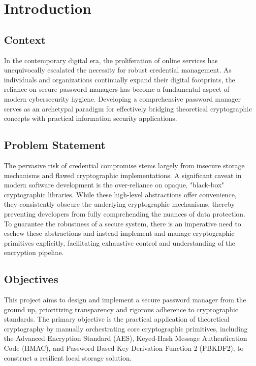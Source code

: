 \chapter{Introduction}
\label{ch:intro}

\section{Context}
In the contemporary digital era, the proliferation of online services has unequivocally escalated the necessity for robust credential management. As individuals and organizations continually expand their digital footprints, the reliance on secure password managers has become a fundamental aspect of modern cybersecurity hygiene. Developing a comprehensive password manager serves as an archetypal paradigm for effectively bridging theoretical cryptographic concepts with practical information security applications.

\section{Problem Statement}
The pervasive risk of credential compromise stems largely from insecure storage mechanisms and flawed cryptographic implementations. A significant caveat in modern software development is the over-reliance on opaque, "black-box" cryptographic libraries. While these high-level abstractions offer convenience, they consistently obscure the underlying cryptographic mechanisms, thereby preventing developers from fully comprehending the nuances of data protection. To guarantee the robustness of a secure system, there is an imperative need to eschew these abstractions and instead implement and manage cryptographic primitives explicitly, facilitating exhaustive control and understanding of the encryption pipeline.

\section{Objectives}
\label{sec:objectives}
This project aims to design and implement a secure password manager from the ground up, prioritizing transparency and rigorous adherence to cryptographic standards. The primary objective is the practical application of theoretical cryptography by manually orchestrating core cryptographic primitives, including the Advanced Encryption Standard (AES), Keyed-Hash Message Authentication Code (HMAC), and Password-Based Key Derivation Function 2 (PBKDF2), to construct a resilient local storage solution.

